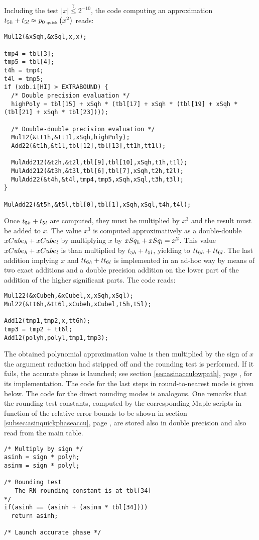 Including the test $\left \vert x \right \vert \stackrel{?}{\leq} 2^{-10}$, the code computing 
an approximation $t_{5\mathit{h}} + t_{5\mathit{l}} \approx p_{0\mbox{\tiny ~quick}}\left( x^2 \right)$ reads:
\begin{lstlisting}[caption={Low path quick phase polynomial approximation (higher degrees)},firstnumber=1]
Mul12(&xSqh,&xSql,x,x);

tmp4 = tbl[3];
tmp5 = tbl[4];
t4h = tmp4;
t4l = tmp5;
if (xdb.i[HI] > EXTRABOUND) {
  /* Double precision evaluation */
  highPoly = tbl[15] + xSqh * (tbl[17] + xSqh * (tbl[19] + xSqh * (tbl[21] + xSqh * tbl[23])));

  /* Double-double precision evaluation */
  Mul12(&tt1h,&tt1l,xSqh,highPoly);
  Add22(&t1h,&t1l,tbl[12],tbl[13],tt1h,tt1l);
  
  MulAdd212(&t2h,&t2l,tbl[9],tbl[10],xSqh,t1h,t1l);
  MulAdd212(&t3h,&t3l,tbl[6],tbl[7],xSqh,t2h,t2l);
  MulAdd22(&t4h,&t4l,tmp4,tmp5,xSqh,xSql,t3h,t3l);
}

MulAdd22(&t5h,&t5l,tbl[0],tbl[1],xSqh,xSql,t4h,t4l);
\end{lstlisting}
Once $t_{5\mathit{h}} + t_{5\mathit{l}}$ are computed, they must be multiplied by
$x^3$ and the result must be added to $x$.  The value $x^3$ is
computed approximatively as a double-double $xCube_{\mathit{h}} + xCube_{\mathit{l}}$ by
multiplying $x$ by $xSq_{\mathit{h}} + xSq_{\mathit{l}} = x^2$. This value $xCube_{\mathit{h}} +
xCube_{\mathit{l}}$ is than multiplied by $t_{5\mathit{h}} + t_{5\mathit{l}}$, yielding to
$tt_{6\mathit{h}} + tt_{6\mathit{l}}$. The last addition implying $x$ and $tt_{6\mathit{h}}
+ tt_{6\mathit{l}}$ is implemented in an ad-hoc way by means of two exact
additions and a double precision addition on the lower part of the
addition of the higher significant parts. The code reads:
\begin{lstlisting}[caption={Low path quick phase polynomial approximation (lower degrees)},firstnumber=1]
Mul122(&xCubeh,&xCubel,x,xSqh,xSql);
Mul22(&tt6h,&tt6l,xCubeh,xCubel,t5h,t5l);

Add12(tmp1,tmp2,x,tt6h);
tmp3 = tmp2 + tt6l;
Add12(polyh,polyl,tmp1,tmp3);
\end{lstlisting} 
The obtained polynomial approximation value is then multiplied by the
sign of $x$ the argument reduction had stripped off and the rounding
test is performed.  If it fails, the accurate phase is launched; see
section \ref{sec:asinacculowpath}, page \pageref{sec:asinacculowpath},
for its implementation.  The code for the last steps in
round-to-nearest mode is given below. The code for the direct rounding
modes is analogous. One remarks that the rounding test constants,
computed by the corresponding Maple scripts in function of the
relative error bounds to be shown in section
\ref{subsec:asinquickphaseaccu}, page
\pageref{subsec:asinquickphaseaccu}, are stored also in double
precision and also read from the main table.
\begin{lstlisting}[caption={Low path quick phase rounding test},firstnumber=1]
/* Multiply by sign */
asinh = sign * polyh;
asinm = sign * polyl;

/* Rounding test 
   The RN rounding constant is at tbl[34]
*/
if(asinh == (asinh + (asinm * tbl[34]))) 
  return asinh;

/* Launch accurate phase */
\end{lstlisting} 

